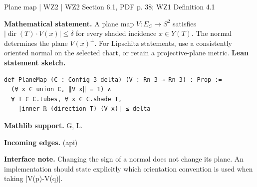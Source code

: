 \documentclass[10pt,a4paper]{article}
\newcommand{\nodecard}[1]{\hyperlink{node-#1}{\texttt{\detokenize{#1}}}}
\begin{document}
\begin{minipage}{\linewidth}
\hypertarget{node-Dplane}{}
\begin{tcolorbox}[colback=white,colframe=planefg,colbacktitle=planebg,coltitle=ink,boxrule=0.45pt,arc=1.6mm,left=3mm,right=3mm,top=2mm,bottom=2mm,title={\sffamily\bfseries WZ2 Section 6.1: plane map \hfill \texttt{Dplane}}]
{\sffamily\small\color{muted}Plane map | WZ2 | WZ2 Section 6.1, PDF p. 38; WZ1 Definition 4.1}\par
\textbf{Mathematical statement.} A plane map $V:E_C\to S^2$ satisfies $|\operatorname{dir}(T)\cdot V(x)|\le\delta$ for every shaded incidence $x\in Y(T)$.
The normal determines the plane $V(x)^\perp$. For Lipschitz statements, use a consistently oriented normal on the selected chart, or retain a projective-plane metric.
\smallskip\textbf{Lean statement sketch.}
\begin{Verbatim}[fontsize=\small,breaklines=true,breakanywhere=true,tabsize=2]
def PlaneMap (C : Config 3 delta) (V : Rn 3 → Rn 3) : Prop :=
  (∀ x ∈ union C, ‖V x‖ = 1) ∧
  ∀ T ∈ C.tubes, ∀ x ∈ C.shade T,
    |inner ℝ (direction T) (V x)| ≤ delta
\end{Verbatim}
{\footnotesize\textbf{Mathlib support.} G, L.\par
\textbf{Incoming edges.} \nodecard{Igeom} (api)\par}
{\footnotesize\textbf{Interface note.} Changing the sign of a normal does not change its plane. An implementation should state explicitly which orientation convention is used when taking |V(p)-V(q)|.}
\end{tcolorbox}\end{minipage}\par\medskip
\end{document}
